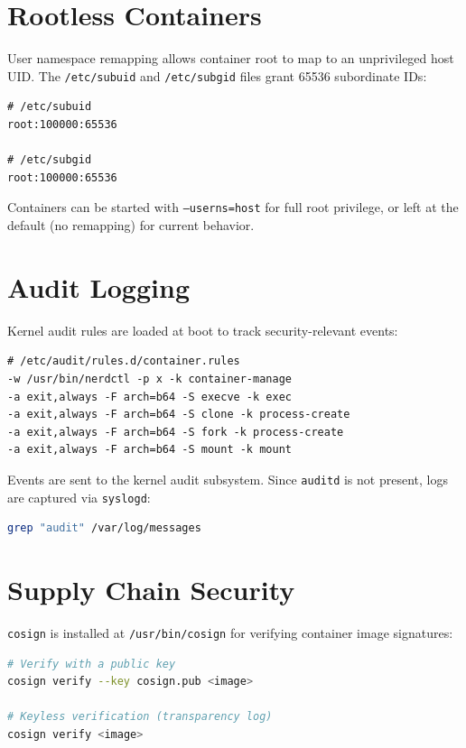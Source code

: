 \section{Rootless Containers}

User namespace remapping allows container root to map to an
unprivileged host UID. The \texttt{/etc/subuid} and \texttt{/etc/subgid}
files grant 65536 subordinate IDs:

\begin{lstlisting}
# /etc/subuid
root:100000:65536

# /etc/subgid
root:100000:65536
\end{lstlisting}

Containers can be started with \texttt{--userns=host} for full root
privilege, or left at the default (no remapping) for current behavior.

\section{Audit Logging}

Kernel audit rules are loaded at boot to track security-relevant events:

\begin{lstlisting}
# /etc/audit/rules.d/container.rules
-w /usr/bin/nerdctl -p x -k container-manage
-a exit,always -F arch=b64 -S execve -k exec
-a exit,always -F arch=b64 -S clone -k process-create
-a exit,always -F arch=b64 -S fork -k process-create
-a exit,always -F arch=b64 -S mount -k mount
\end{lstlisting}

Events are sent to the kernel audit subsystem. Since \texttt{auditd}
is not present, logs are captured via \texttt{syslogd}:

\begin{lstlisting}[language=bash]
grep "audit" /var/log/messages
\end{lstlisting}

\section{Supply Chain Security}

\texttt{cosign} is installed at \texttt{/usr/bin/cosign} for
verifying container image signatures:

\begin{lstlisting}[language=bash]
# Verify with a public key
cosign verify --key cosign.pub <image>

# Keyless verification (transparency log)
cosign verify <image>
\end{lstlisting}

